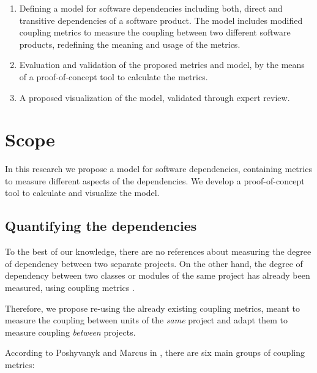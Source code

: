 \begin{enumerate}
	\item Defining a model for software dependencies including both, direct and transitive dependencies of a software product. The model includes modified coupling metrics to measure the coupling between two different software products, redefining the meaning and usage of the metrics.
  \blankls

	\item Evaluation and validation of the proposed metrics and model, by the means of a proof-of-concept tool to calculate the metrics.

  \item A proposed visualization of the model, validated through expert review.
\end{enumerate}

\section{Scope}\label{section:scope}

In this research we propose a model for software dependencies, containing metrics to measure different aspects of the dependencies. We develop a proof-of-concept tool to calculate and visualize the model.

\subsection{Quantifying the dependencies}
To the best of our knowledge, there are no references about measuring the degree of dependency between two separate projects. On the other hand, the degree of dependency between two classes or modules of the same project has already been measured, using coupling metrics \cite{briand1999unified}.

Therefore, we propose re-using the already existing coupling metrics, meant to measure the coupling between units of the \textit{same} project and adapt them to measure coupling \textit{between} projects.

\blankl
According to Poshyvanyk and Marcus in \cite{poshyvanyk2006conceptual}, there are six main groups of coupling metrics:


